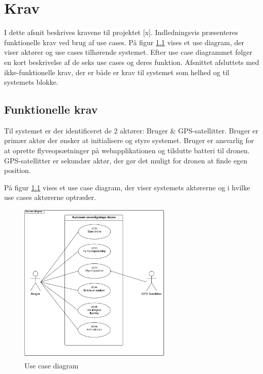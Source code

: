 \chapter{Krav}
\vspace{-0.5cm}
I dette afsnit beskrives kravene til projektet [x]. Indledningsvis præsenteres funktionelle krav  ved brug af use cases. På figur \ref{fig:useCaseDiagram} vises et use diagram, der viser aktører og use cases tilhørende systemet. Efter use case diagrammet følger en kort beskrivelse af de seks use cases og deres funktion. Afsnittet afsluttets med ikke-funktionelle krav, der er både er krav til systemet som helhed og til systemets blokke.
\vspace{-0.3cm}

\section{Funktionelle krav}
\vspace{-0.2cm}
Til systemet er der identificeret de 2 aktører: Bruger \& GPS-satellitter. Bruger er primær aktør der ønsker at initialisere og styre systemet. Bruger er ansvarlig for at oprette flyveopsætninger på webapplikationen og tilslutte batteri til dronen.
GPS-satellitter er sekundær aktør, der gør det muligt for dronen at finde egen position. 

På figur \ref{fig:useCaseDiagram} vises et use case diagram, der viser systemets aktørerne og i hvilke use cases aktørerne optræder. 
\begin{figure}[H]
	\centering
	\includegraphics[width=0.65\textwidth]{Billeder/Krav/Use_case_diagram}
	\vspace{-0.3cm}	
	\caption{Use case diagram}
	\label{fig:useCaseDiagram}
\end{figure}

